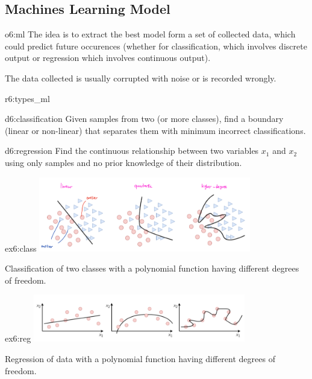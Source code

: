 \documentclass{tron}
\begin{document}
\subsection{Machines Learning Model}
\begin{overview}{o6:ml}
		The idea is to extract the best model form a set of collected data, which could predict future occurences (whether for classification, which involves discrete output or regression which involves continuous output).
		
		The data collected is usually corrupted with noise or is recorded wrongly.
\end{overview}

\begin{remark}{r6:types_ml}
	\begin{definition}[Classification]{d6:classification}
		Given samples from two (or more classes), find a boundary (linear or non-linear) that separates them with minimum incorrect classifications.
	\end{definition}	
	\begin{definition}[Regression]{d6:regression}
		Find the continuous relationship between two variables $x_1$ and $x_2$ using only samples and no prior knowledge of their distribution.
	\end{definition}
\end{remark}

\begin{example}{ex6:class}
	\includegraphics[width=350px]{Figs/Lec6/class_lm.png}
	
	Classification of two classes with a polynomial function having different degrees of freedom. 
\end{example}

\begin{example}{ex6:reg}
	\includegraphics[width=350px]{Figs/Lec6/reg_lm.png}
	
	Regression of data with a polynomial function having different degrees of freedom.
\end{example}
\end{document}
